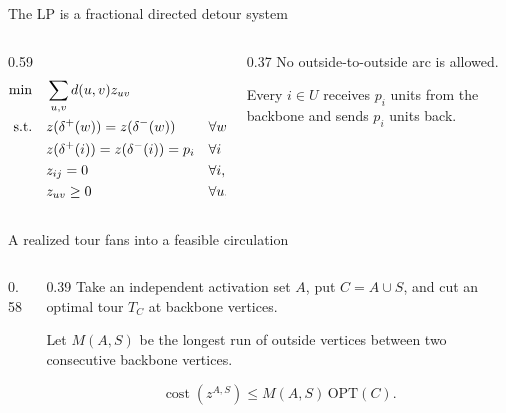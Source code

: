 \documentclass[aspectratio=169,12pt]{beamer}
\newcommand{\OPT}{\mathrm{OPT}}
\newcommand{\cost}{\operatorname{cost}}
\newcommand{\1}{\mathbf{1}}
\begin{document}
\begin{frame}{The LP is a fractional directed detour system}
  \begin{columns}[T,onlytextwidth]
    \begin{column}{0.59\textwidth}
      {\fontsize{12.5pt}{15pt}\selectfont
      \[
      \begin{aligned}
        \min\quad &\sum_{u,v} d(u,v)z_{uv}\\
        \text{s.t.}\quad
          &z(\delta^+(w))=z(\delta^-(w))
            &&\forall w,\\
          &z(\delta^+(i))=z(\delta^-(i))=p_i
            &&\forall i\in U,\\
          &z_{ij}=0
            &&\forall i,j\in U,\\
          &z_{uv}\ge0
            &&\forall u,v.
      \end{aligned}
      \tag{\(\mathrm{CIRC}(S)\)}
      \]}
    \end{column}
    \begin{column}{0.37\textwidth}
      \vspace{0.40cm}
      No outside-to-outside arc is allowed.

      \vspace{0.38cm}
      Every \(i\in U\) receives \(p_i\) units from the backbone and sends
      \(p_i\) units back.

      \vspace{0.28cm}
      {\small
      }
    \end{column}
  \end{columns}
\end{frame}

\begin{frame}{A realized tour fans into a feasible circulation}
  \begin{columns}[T,onlytextwidth]
    \begin{column}{0.58\textwidth}
      \centering
      \vspace{0.18cm}
      \resizebox{0.96\linewidth}{!}{\StFanFlow}
    \end{column}
    \begin{column}{0.39\textwidth}
      Take an independent activation set \(A\), put \(C=A\cup S\), and cut an
      optimal tour \(T_C\) at backbone vertices.

      \vspace{0.20cm}
      Let \(M(A,S)\) be the longest run of outside vertices between two
      consecutive backbone vertices.

      \[
        \cost(z^{A,S})
        \le M(A,S)\,\OPT(C).
      \]

    \end{column}
  \end{columns}
\end{frame}
\end{document}
